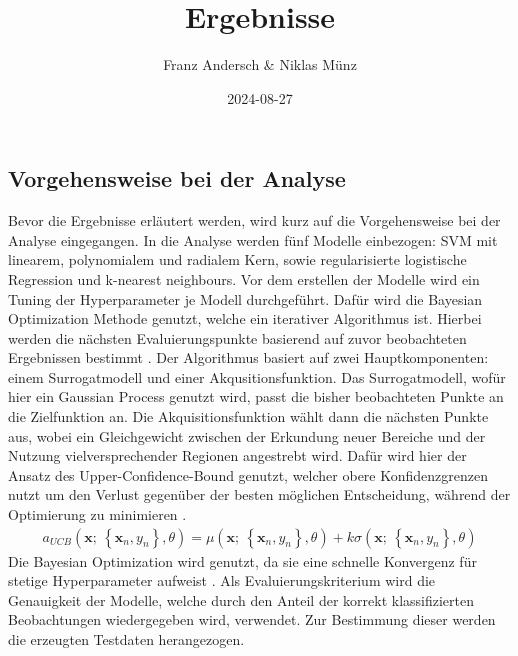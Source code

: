 \documentclass[
]{article}
\title{Ergebnisse}
\author{Franz Andersch \& Niklas Münz}
\date{2024-08-27}
\renewcommand{\maketitle}{}
\begin{document}
\maketitle

\subsection{Vorgehensweise bei der Analyse}

Bevor die Ergebnisse erläutert werden, wird kurz auf die Vorgehensweise
bei der Analyse eingegangen. In die Analyse werden fünf Modelle
einbezogen: SVM mit linearem, polynomialem und radialem Kern, sowie
regularisierte logistische Regression und k-nearest neighbours.\newline
Vor dem erstellen der Modelle wird ein Tuning der Hyperparameter je
Modell durchgeführt. Dafür wird die Bayesian Optimization Methode
genutzt, welche ein iterativer Algorithmus ist. Hierbei werden die
nächsten Evaluierungspunkte basierend auf zuvor beobachteten Ergebnissen
bestimmt \parencite{yangHyperparameterOptimizationMachine2020}. Der
Algorithmus basiert auf zwei Hauptkomponenten: einem Surrogatmodell und
einer Akqusitionsfunktion. Das Surrogatmodell, wofür hier ein Gaussian
Process genutzt wird, passt die bisher beobachteten Punkte an die
Zielfunktion an. Die Akquisitionsfunktion wählt dann die nächsten Punkte
aus, wobei ein Gleichgewicht zwischen der Erkundung neuer Bereiche und
der Nutzung vielversprechender Regionen angestrebt wird. Dafür wird hier
der Ansatz des Upper-Confidence-Bound genutzt, welcher obere
Konfidenzgrenzen nutzt um den Verlust gegenüber der besten möglichen
Entscheidung, während der Optimierung zu minimieren
\parencite{snoekPracticalBayesianOptimization2012}. \begin{align}
a_{UCB}(\mathbf{x};~\left\{\mathbf{x}_n,y_n\right\},\theta) = \mu(\mathbf{x};~\left\{\mathbf{x}_n,y_n\right\},\theta) + k \sigma(\mathbf{x};~\left\{\mathbf{x}_n,y_n\right\},\theta)
\end{align} Die Bayesian Optimization wird genutzt, da sie eine schnelle
Konvergenz für stetige Hyperparameter aufweist
\parencite{yangHyperparameterOptimizationMachine2020}. Als
Evaluierungskriterium wird die Genauigkeit der Modelle, welche durch den
Anteil der korrekt klassifizierten Beobachtungen wiedergegeben wird,
verwendet. Zur Bestimmung dieser werden die erzeugten Testdaten
herangezogen.
\end{document}
